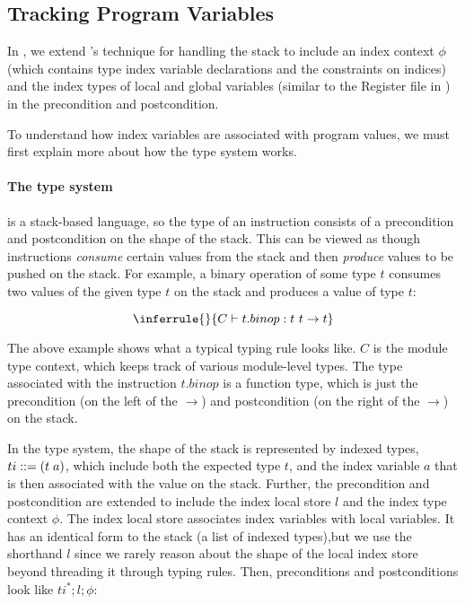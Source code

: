 \subsection{Tracking Program Variables}
In \name, we extend \wasm's technique for handling the stack to include an index context $\phi$ (which contains type index variable declarations and the constraints on indices) and the index types of local and global variables (similar to the Register file in \dtal) in the precondition and postcondition.


To understand how \name index variables are associated with \name program values, we must first explain more about how the \wasm type system works.

\paragraph{The \wasm type system}
\wasm is a stack-based language, so the type of an instruction consists of a precondition and postcondition on the shape of the stack.
This can be viewed as though instructions \emph{consume} certain values from the stack and then \emph{produce} values to be pushed on the stack.
For example, a binary operation of some type $t$ consumes two values of the given type $t$ on the stack and produces a value of type $t$:

\[
    \inferrule{ }{C \vdash t.binop : t\ t \rightarrow t}
\]

The above example shows what a typical \wasm typing rule looks like.
$C$ is the module type context, which keeps track of various module-level types.
The type associated with the instruction $t.binop$ is a \wasm function type, which is just the precondition (on the left of the $\rightarrow$) and postcondition (on the right of the $\rightarrow$) on the stack.

In the \name type system, the shape of the stack is represented by indexed types, $ti ::= (t\;a)$, which include both the expected \wasm type $t$, and the index variable $a$ that is then associated with the value on the stack.
Further, the precondition and postcondition are extended to include the index local store $l$ and the index type context $\phi$.
The index local store associates index variables with \wasm local variables.
It has an identical form to the stack (a list of indexed types),but  we use the shorthand $l$ since we rarely reason about the shape of the local index store beyond threading it through typing rules.
Then, \name preconditions and postconditions look like $ti^{*}; l; \phi$:

